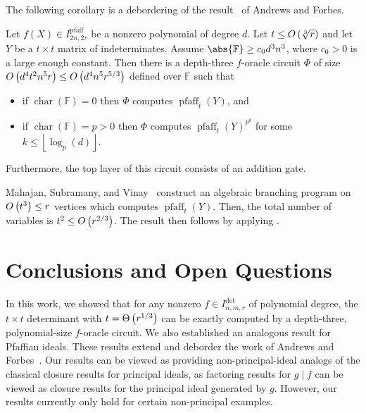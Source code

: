 \documentclass[10pt,a4paper]{amsart}
\DeclareMathOperator{\pfaff}{pfaff}
\DeclareMathOperator{\characteristic}{char}
\newcommand*\F{\mathbb{F}}
\newcommand*\floor[1]{%
    \left\lfloor #1 \right\rfloor
}
\newcommand*\bigO[1]{%
    O\kern-0.0pt\left(#1\right)
}
\newcommand*\bigTheta[1]{%
    \Theta\kern-0.0pt\left(#1\right)
}
\begin{document}
The following corollary is a debordering of the result~\cite[Corollary 4.5]{AF21} of Andrews and Forbes.
\begin{cor}\label{cor:pfaff_oracle_for_pfaff}
    Let $f(X) \in I^{\pfaff}_{2n, 2r}$ be a nonzero polynomial of degree $d$.
    Let $t \leq \bigO{\sqrt[3]{r}}$ and let $Y$ be a $t \times t$ matrix of indeterminates.
    Assume $\abs{\F} \geq c_0 d^3 n^3$, where $c_0>0$ is a large enough constant.
    Then there is a depth-three $f$-oracle circuit $\Phi$ of size $\bigO{d^4 t^2 n^5 r} \leq \bigO{d^4 n^5 r^{5 / 3}}$ defined over $\F$ such that
    \begin{itemize}
        \item if $\characteristic(\F) = 0$ then $\Phi$ computes $\pfaff_t(Y)$, and
        \item if $\characteristic(\F) = p > 0$ then $\Phi$ computes $\pfaff_t(Y)^{p^k}$ for some $k \leq \floor{\log_p(d)}$.
    \end{itemize}
    Furthermore, the top layer of this circuit consists of an addition gate.
\end{cor}
\begin{pf}
    Mahajan, Subramany, and Vinay~\cite[Theorem 12]{MSV04} construct an algebraic branching program on $\bigO{t^3} \leq r$ vertices which computes $\pfaff_{t}(Y)$.
    Then, the total number of variables is $t^2 \leq \bigO{r^{2 / 3}}$.
    The result then follows by applying .
\end{pf}


\section{Conclusions and Open Questions}

In this work, we showed that for any nonzero $f \in I^{\det}_{n,m,r}$ of polynomial degree, the $t\times t$ determinant with $t = \bigTheta{r^{1/3}}$ can be exactly computed by a depth-three, polynomial-size $f$-oracle circuit.
We also established an analogous result for Pfaffian ideals.
These results extend and deborder the work of Andrews and Forbes~\cite{AF21}.
Our results can be viewed as providing non-principal-ideal analogs of the classical closure results for principal ideals, as factoring results for $g \mid f$ can be viewed as closure results for the principal ideal generated by $g$.
However, our results currently only hold for certain non-principal examples.
\end{document}
